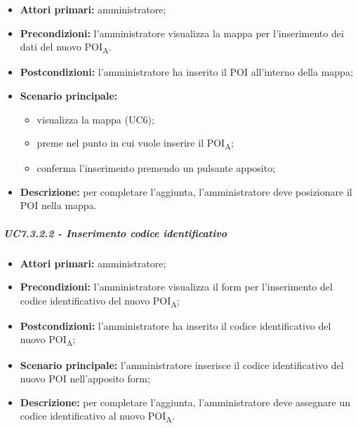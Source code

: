 \begin{itemize}

   \item   \textbf{Attori primari:} amministratore;

\item   \textbf{Precondizioni:} l'amministratore visualizza la mappa per l'inserimento dei dati del nuovo POI\textsubscript{A}.

  \item   \textbf{Postcondizioni:} l'amministratore ha inserito il POI all'interno della mappa; 

   \item   \textbf{Scenario principale:}

    \begin{itemize}
        \item visualizza la mappa (UC6);

        \item preme nel punto in cui vuole inserire il POI\textsubscript{A};
		     \item conferma l'inserimento premendo un pulsante apposito;

   \end{itemize}

   \item   \textbf{Descrizione:} per completare l'aggiunta, l'amministratore deve posizionare il POI nella mappa.



\end{itemize}



\subparagraph{UC7.3.2.2 - Inserimento codice identificativo}

\begin{itemize}

  \item   \textbf{Attori primari:} amministratore;

   \item   \textbf{Precondizioni:} l'amministratore visualizza il form per l'inserimento del codice identificativo del nuovo POI\textsubscript{A};

   \item   \textbf{Postcondizioni:} l'amministratore ha inserito il codice identificativo del nuovo POI\textsubscript{A}; 

   \item   \textbf{Scenario principale:} l'amministratore inserisce il codice identificativo del nuovo POI nell'apposito form;

   \item   \textbf{Descrizione:} per completare l'aggiunta, l'amministratore deve assegnare un codice identificativo al nuovo POI\textsubscript{A}.



\end{itemize}



